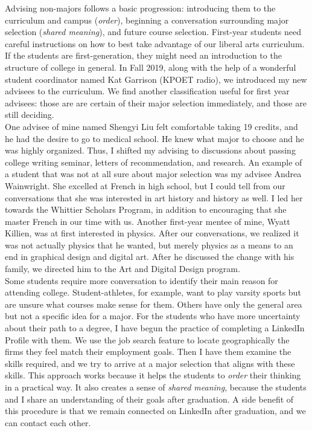 \documentclass[../../../main.tex]{subfiles}
\begin{document}
Advising non-majors follows a basic progression: introducing them to the curriculum and campus (\textit{order}), beginning a conversation surrounding major selection (\textit{shared meaning}), and future course selection.  First-year students need careful instructions on how to best take advantage of our liberal arts curriculum.  If the students are first-generation, they might need an introduction to the structure of college in general.  In Fall 2019, along with the help of a wonderful student coordinator named Kat Garrison (KPOET radio), we introduced my new advisees to the curriculum.  We find another classification useful for first year advisees: those are are certain of their major selection immediately, and those are still deciding.
\\
\vspace{0.25cm}
One advisee of mine named Shengyi Liu felt comfortable taking 19 credits, and he had the desire to go to medical school.  He knew what major to choose and he was highly organized.  Thus, I shifted my advising to discussions about passing college writing seminar, letters of recommendation, and research.  An example of a student that was not at all sure about major selection was my advisee Andrea Wainwright.  She excelled at French in high school, but I could tell from our conversations that she was interested in art history and history as well.  I led her towards the Whittier Scholars Program, in addition to encouraging that she master French in our time with us.  Another first-year mentee of mine, Wyatt Killien, was at first interested in physics.  After our conversations, we realized it was not actually physics that he wanted, but merely physics as a means to an end in graphical design and digital art.  After he discussed the change with his family, we directed him to the Art and Digital Design program.
\\
\vspace{0.25cm}
Some students require more conversation to identify their main reason for attending college.  Student-athletes, for example, want to play varsity sports but are unsure what courses make sense for them.  Others have only the general area but not a specific idea for a major.  For the students who have more uncertainty about their path to a degree, I have begun the practice of completing a LinkedIn Profile with them.  We use the job search feature to locate geographically the firms they feel match their employment goals.  Then I have them examine the skills required, and we try to arrive at a major selection that aligns with these skills.  This approach works because it helps the students to \textit{order} their thinking in a practical way.  It also creates a sense of \textit{shared meaning}, because the students and I share an understanding of their goals after graduation.  A side benefit of this procedure is that we remain connected on LinkedIn after graduation, and we can contact each other.
\end{document}

